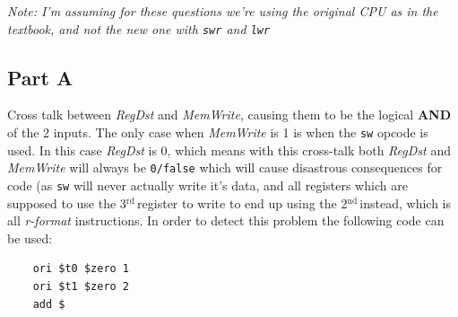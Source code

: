 \documentclass[11pt]{article} %
\newcommand{\strong}[1]{\textbf{#1}}
\newcommand{\code}[1]{\texttt{#1}}
\newcommand{\nd}{$^{\text{nd}\ }$}
\newcommand{\rd}{$^{\text{rd}\ }$}
\begin{document}
\emph{Note: I'm assuming for these questions we're using the original CPU as in the textbook, and not the new one with \code{swr} and \code{lwr}}

\subsection{Part A}

Cross talk between \emph{RegDst} and \emph{MemWrite}, causing them to be the logical \strong{AND} of the 2 inputs. The only case when \emph{MemWrite} is 1 is when the \code{sw} opcode is used. In this case \emph{RegDst} is 0, which means with this cross-talk both \emph{RegDst} and \emph{MemWrite} will always be \code{0/false} which will cause disastrous consequences for code (as \code{sw} will never actually write it's data, and all registers which are supposed to use the 3\rd register to write to end up using the 2\nd instead, which is all \emph{r-format} instructions. In order to detect this problem the following code can be used:

\begin{verbatim}
	ori $t0 $zero 1
	ori $t1 $zero 2
	add $
\end{verbatim}
\end{document}
